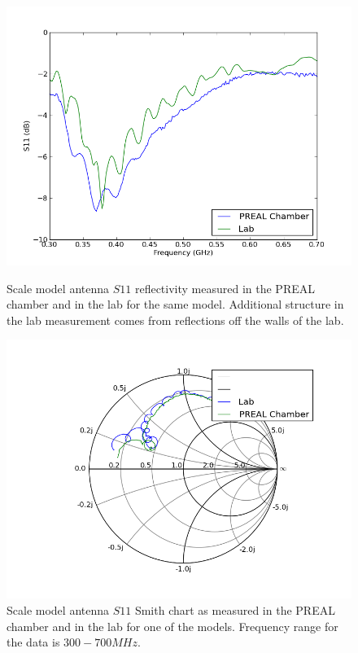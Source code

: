 \begin{figure}[htb]
\centering
\begin{minipage}[b]{0.46\textwidth}
\centering
\includegraphics[width=0.95\linewidth]{SCIHI_system/figures/HIbiscus_S11_model_dB_PREAL.png}
\caption{Scale model antenna $S11$ reflectivity measured in the PREAL chamber and in the lab for the same model. Additional structure in the lab measurement comes from reflections off the walls of the lab.  }
\label{Fig:HIS11_model_dB}
\end{minipage}%
\begin{minipage}[b]{0.02\textwidth}
\hspace{1cm}
\end{minipage}%
\begin{minipage}[b]{0.48\textwidth}
\centering
\includegraphics[width=0.95\linewidth]{SCIHI_system/figures/HIbiscus_S11_model_Smith_PREAL.png}
\caption{Scale model antenna $S11$ Smith chart as measured in the PREAL chamber and in the lab for one of the models. Frequency range for the data is $300-700 MHz$.}
\label{Fig:HIS11_model_Smith}
\end{minipage}
\end{figure}

